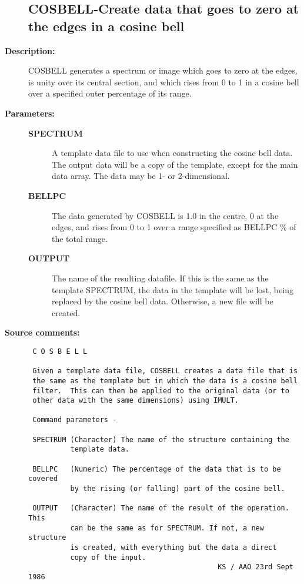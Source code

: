 \begin{description}
\subsection{COSBELL-\label{COSBELL}Create data that goes to zero at the edges in a cosine bell}
\begin{description}
\end{description}

\item [{\bf Description:}]
 COSBELL generates a spectrum or image which goes to zero at the
 edges, is unity over its central section, and which rises from
 0 to 1 in a cosine bell over a specified outer percentage of
 its range.

\item [{\bf Parameters:}]
\begin{description}
\item [{\bf SPECTRUM}]
 A template data file to use when constructing the
 cosine bell data.  The output data will be a copy
 of the template, except for the main data array.
 The data may be 1- or 2-dimensional.
\item [{\bf BELLPC}]
 The data generated by COSBELL is 1.0 in the centre,
 0 at the edges, and rises from 0 to 1 over a range
 specified as BELLPC \% of the total range.
\item [{\bf OUTPUT}]
 The name of the resulting datafile.
 If this is the same as the template SPECTRUM, the data
 in the template will be lost, being replaced by the
 cosine bell data.  Otherwise, a new file will be created.
\end{description}

\item [{\bf Source comments:}]
\begin{verbatim}
 C O S B E L L

 Given a template data file, COSBELL creates a data file that is
 the same as the template but in which the data is a cosine bell
 filter.  This can then be applied to the original data (or to
 other data with the same dimensions) using IMULT.

 Command parameters -

 SPECTRUM (Character) The name of the structure containing the
          template data.

 BELLPC   (Numeric) The percentage of the data that is to be covered
          by the rising (or falling) part of the cosine bell.

 OUTPUT   (Character) The name of the result of the operation.  This
          can be the same as for SPECTRUM. If not, a new structure
          is created, with everything but the data a direct
          copy of the input.
                                             KS / AAO 23rd Sept 1986
\end{verbatim}
\end{description}
